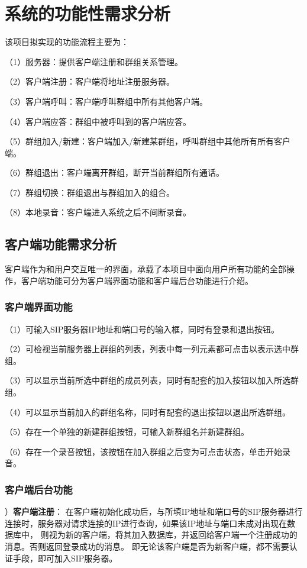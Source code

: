 \documentclass[a4paper,AutoFakeBold,oneside,12pt]{book}
\begin{document}
\section{系统的功能性需求分析}
该项目拟实现的功能流程主要为：

（1）服务器：提供客户端注册和群组关系管理。

（2）客户端注册：客户端将地址注册服务器。

（3）客户端呼叫：客户端呼叫群组中所有其他客户端。

（4）客户端应答：群组中被呼叫到的客户端应答。

（5）群组加入/新建：客户端加入/新建某群组，呼叫群组中其他所有所有客户端。

（6）群组退出：客户端离开群组，断开当前群组所有通话。

（7）群组切换：群组退出与群组加入的组合。

（8）本地录音：客户端进入系统之后不间断录音。
\subsection{客户端功能需求分析}
客户端作为和用户交互唯一的界面，承载了本项目中面向用户所有功能的全部操作，客户端功能可分为客户端界面功能和客户端后台功能进行介绍。
\subsubsection{客户端界面功能}

（1）可输入SIP服务器IP地址和端口号的输入框，同时有登录和退出按钮。

（2）可检视当前服务器上群组的列表，列表中每一列元素都可点击以表示选中群组。

（3）可以显示当前所选中群组的成员列表，同时有配套的加入按钮以加入所选群组。

（4）可以显示当前加入的群组名称，同时有配套的退出按钮以退出所选群组。

（5）存在一个单独的新建群组按钮，可输入新群组名并新建群组。

（6）存在一个录音按钮，该按钮在加入群组之后变为可点击状态，单击开始录音。

\subsubsection{客户端后台功能}）\textbf{客户端注册}：
在客户端初始化成功后，与所填IP地址和端口号的SIP服务器进行连接时，服务器对请求连接的IP进行查询，如果该IP地址与端口未成对出现在数据库中，
则视为新的客户端，将其加入数据库，并返回给客户端一个注册成功的消息。否则返回登录成功的消息。
即无论该客户端是否为新客户端，都不需要认证手段，即可加入SIP服务器。
\end{document}
